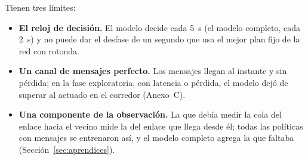 Tienen tres límites:
\begin{itemize}
  \item \textbf{El reloj de decisión.} El modelo decide cada 5~s (el
    modelo completo, cada 2~s) y no puede dar el desfase de un segundo
    que usa el mejor plan fijo de la red con rotonda.
  \item \textbf{Un canal de mensajes perfecto.} Los mensajes llegan al
    instante y sin pérdida; en la fase exploratoria, con latencia o
    pérdida, el modelo dejó de superar al actuado en el corredor
    (Anexo~C).
  \item \textbf{Una componente de la observación.} La que debía medir la
    cola del enlace hacia el vecino mide la del enlace que llega desde
    él; todas las políticas con mensajes se entrenaron así, y el modelo
    completo agrega la que faltaba (Sección~\ref{sec:aprendices}).
\end{itemize}

